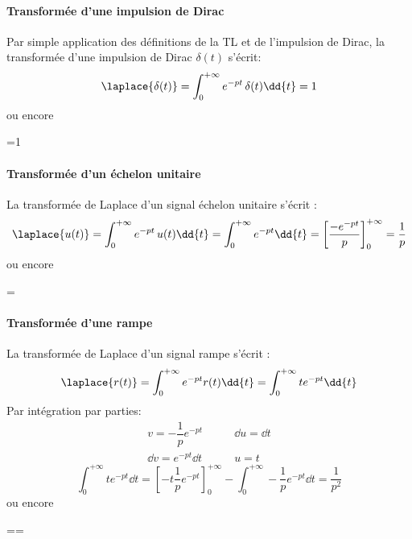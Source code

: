 \paragraph{Transformée d'une impulsion de Dirac}
Par simple application des définitions 
de la TL et de l'impulsion de Dirac, la transformée d'une 
impulsion de Dirac $\delta(t)$ s'écrit:
$$
\laplace{\delta(t)}=\int_{0}^{+\infty} e^{-pt}\,\delta(t)\dd{t}=1
$$
ou encore
\begin{bequation}
    =1
\end{bequation}

\paragraph{Transformée d'un échelon unitaire}
La transformée de Laplace d'un signal échelon unitaire s'écrit : 
$$
\laplace{u(t)}=\int_{0}^{+\infty} e^{-pt}\,u(t)\dd{t}=\int_{0}^{+\infty} e^{-pt}\dd{t}=\left[\dfrac{-e^{-pt}}{p}\right]_0^{+\infty}=\dfrac{1}{p}
$$
ou encore
\begin{bequation}
    =
\end{bequation}
\paragraph{Transformée d'une rampe}
La transformée de Laplace d'un signal rampe s'écrit :
$$
\laplace{r(t)}=\int_{0}^{+\infty} e^{-pt}r(t)\dd{t}=\int_{0}^{+\infty} te^{-pt}\dd{t}
$$
Par intégration par parties:
\begin{align*}
    v=-\dfrac{1}{p}e^{-pt}\qquad&\dd{u}=\dd{t}\\
    \dd{v}=e^{-pt}\dd{t}\qquad&u=t
\end{align*}
$$
\int_{0}^{+\infty} te^{-pt}\dd{t} = \left[-t\dfrac{1}{p}e^{-pt}\right]_0^{+\infty}-\int_{0}^{+\infty} -\dfrac{1}{p}e^{-pt}\dd{t}=\dfrac{1}{p^2}
$$
ou encore
\begin{bequation}
    ==
\end{bequation}

